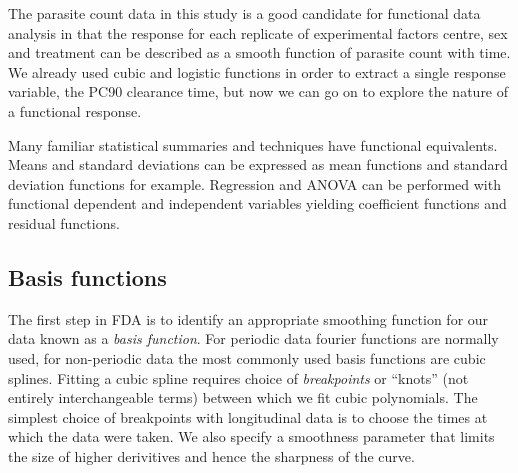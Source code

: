 The parasite count data in this study is a good candidate for functional data analysis in that the response for each replicate of experimental factors centre, sex and treatment can be described as a smooth function of parasite count with time. We already used cubic and logistic functions in order to extract a single response variable, the PC90 clearance time, but now we can go on to explore the nature of a functional response.

Many familiar statistical summaries and techniques have functional equivalents. Means and standard deviations can be expressed as mean functions and standard deviation functions for example. Regression and ANOVA can be performed with functional dependent and independent variables yielding coefficient functions and residual functions.
\subsection{Basis functions}
The first step in FDA is to identify an appropriate smoothing function for our data known as a \emph{basis function}. For periodic data fourier functions are normally used, for non-periodic data the most commonly used basis functions are cubic splines\cite{fda}. Fitting a cubic spline requires choice of \emph{breakpoints} or ``knots'' (not entirely interchangeable terms) between which we fit cubic polynomials. The simplest choice of breakpoints with longitudinal data is to choose the times at which the data were taken. We also specify a smoothness parameter that limits the size of higher derivitives and hence the sharpness of the curve.


